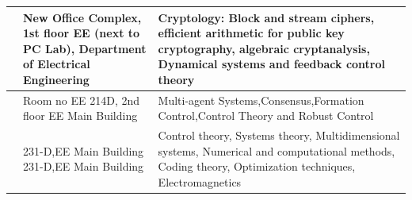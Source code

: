 \documentclass[11pt,openany]{book} %
\begin{document}
\begin{tabular}{|p{4cm}|p{3.5cm}|p{9cm}|}
\hline 
\href{https://www.ee.iitb.ac.in/wiki/faculty/vrs}{} & New Office Complex, 1st floor EE (next to PC Lab), Department of Electrical Engineering & Cryptology: Block and stream ciphers, efficient arithmetic for public key cryptography, algebraic cryptanalysis, Dynamical systems and feedback control theory \\ 
\hline
\href{https://scholar.google.co.in/citations?user=9lWahYMAAAAJ&hl=en}{}& Room no EE 214D, 2nd floor EE  Main Building & Multi-agent Systems,Consensus,Formation Control,Control Theory and Robust Control \\ 
\hline 

\href{https://www.ee.iitb.ac.in/wiki/faculty/hp}{} & 231-D,EE Main Building 231-D,EE Main Building & Control theory, Systems theory, Multidimensional systems, Numerical
and computational methods, Coding theory, Optimization techniques, Electromagnetics \\ 
\hline
\end{tabular}
\end{document}
